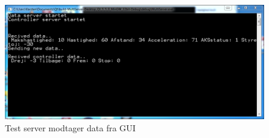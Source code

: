 \begin{figure}[H]
\centering
\includegraphics[width=\textwidth* 3/4,height=\textwidth* 8/20 ]{../fig/billeder/testserver.png}
\caption{Test server modtager data fra GUI}
\label{fig:testserver}
\end{figure}
\vfill
\clearpage


